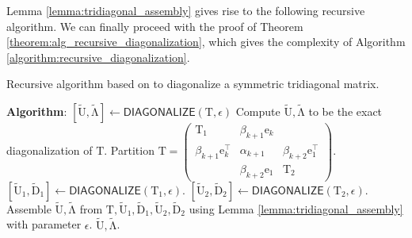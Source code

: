 \documentclass{article}
\newcommand\vece{\boldsymbol{\mathrm{e}}}
\newcommand\matT{\boldsymbol{\mathrm{T}}}
\newcommand\matDtilde{\widetilde{\boldsymbol{\mathrm{D}}}}
\newcommand\matUtilde{\widetilde{\boldsymbol{\mathrm{U}}}}
\newcommand\matLambdatilde{\widetilde{\boldsymbol{\mathrm{\Lambda}}}}
\newcommand{\DIAGONALIZE}{\mathsf{DIAGONALIZE}}
\begin{document}
Lemma \ref{lemma:tridiagonal_assembly} gives rise to the following recursive algorithm. We can finally proceed with the proof of Theorem \ref{theorem:alg_recursive_diagonalization}, which gives the complexity of Algorithm \ref{algorithm:recursive_diagonalization}.
\begin{algorithm}[htb]
    \caption{Recursive algorithm based on \cite{gu1995divide} to diagonalize a symmetric tridiagonal matrix.}
    \label{algorithm:recursive_diagonalization}
    \small
    \begin{algorithmic}[1]
        \Statex \textbf{Algorithm}: $[\matUtilde,\matLambdatilde]\leftarrow \DIAGONALIZE(\matT,\epsilon)$
            \State Compute $\matUtilde,\matLambdatilde$ to be the  exact diagonalization of $\matT$.
        \Else {\bf :}
            \State Partition $\matT = \begin{pmatrix}
                \matT_1 & \beta_{k+1}\vece_k & \\
                \beta_{k+1}\vece_k^\top & \alpha_{k+1} & \beta_{k+2}\vece_1^\top \\
                 & \beta_{k+2}\vece_1 & \matT_2
            \end{pmatrix}$.
            \State $[\matUtilde_1,\matDtilde_1]\leftarrow \DIAGONALIZE(\matT_1,\epsilon)$.
            \State $[\matUtilde_2,\matDtilde_2]\leftarrow \DIAGONALIZE(\matT_2,\epsilon)$.
            \State Assemble $\matUtilde,\matLambdatilde$ from $\matT,\matUtilde_1,\matDtilde_1,\matUtilde_2,\matDtilde_2$ using Lemma \ref{lemma:tridiagonal_assembly} with parameter $\epsilon$.
        \EndIf
        \State \Return $\matUtilde,\matLambdatilde$.
    \end{algorithmic}
\end{algorithm}
\end{document}
